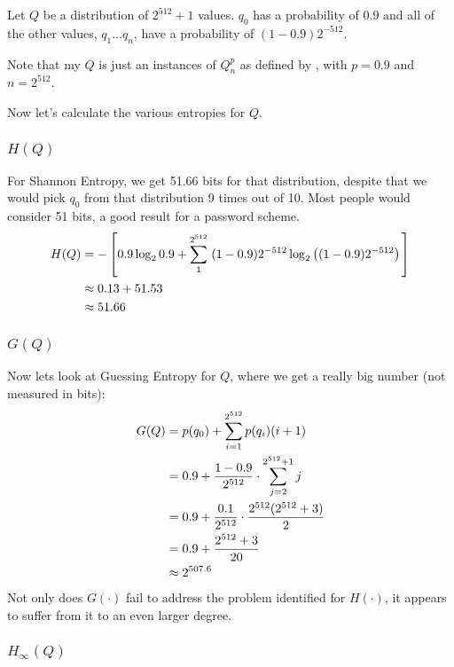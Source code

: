 \documentclass[12pt]{article}
\newcommand\func[1]{\ensuremath{#1(\cdot)}}
\begin{document}
\begin{Definition} \label{def:Q} 
Let $Q$ be a distribution of $2^{512}+1$ values. $q_0$ has a probability of $0.9$ and all of the other values, $q_1 \dots q_n$,
have a probability of $(1-0.9)2^{-512}$.
\end{Definition}
Note that my $Q$ is just an instances of $Q_n^p$ as defined by \cite{Cederlog2005:Thesis}, with $p = 0.9$ and $n=2^{512}$.

Now let's calculate the various entropies for $Q$.

\subsubsection{\(H(Q)\)}

For Shannon Entropy, we get 51.66 bits for that distribution, despite that we would pick $q_0$ from that distribution 9 times out of 10. Most people would consider 51 bits, a good result for a password scheme.
\begin{align}
H(Q) &= -\left[ 0.9\log_2 0.9
       + \sum_1^{2^{512}}\left. (1-0.9) 2^{-512}\log_2\left((1-0.9)2^{-512}\right)\right.\right]\notag \\
     &\approx  0.13 + 51.53\notag \\
     &\approx 51.66 \label{eq:exH}
\end{align}

\subsubsection{\(G(Q)\)}

Now lets look at Guessing Entropy for $Q$, where we get a really big number (not measured in bits):
\begin{align}
G(Q) &= p(q_0) + \sum_{i=1}^{2^{512}} p(q_i)(i+1) \notag \\
     & = 0.9 +  \frac{1-0.9}{2^{512}} \cdot \sum_{j=2}^{2^{512}+1}j \notag \\
     &= 0.9 + \frac{0.1}{2^{512}} \cdot \frac{2^{512}(2^{512} +3)}{2} \notag \\
     &= 0.9 + \frac{2^{512} + 3}{20}\notag \\
     &\approx 2^{507.6} \label{ex:exG}
\end{align}
Not only does $\func G$ fail to address the problem identified for $\func H$, it appears to suffer from it to an even larger degree.

\subsubsection{\(H_\infty(Q)\)}
\end{document}
